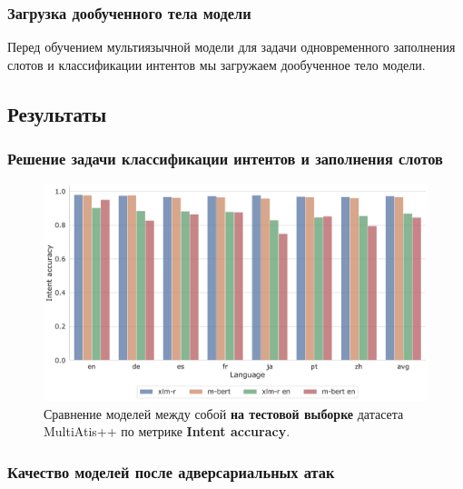 
\subsubsection{Загрузка дообученного тела модели}
Перед обучением мультиязычной модели для задачи одновременного заполнения слотов и классификации интентов мы загружаем дообученное тело модели.

\subsection{Результаты}



\subsubsection{Решение задачи классификации интентов и заполнения слотов}

\begin{figure}[h!]
    \centering
    \includegraphics[width=\textwidth]{images/0}
    \caption{Сравнение моделей между собой \textbf{на тестовой выборке} датасета MultiAtis++ по метрике \textbf{Intent accuracy}.}\label{fig:figure0}
\end{figure}



\subsubsection{Качество моделей после адверсариальных атак}

